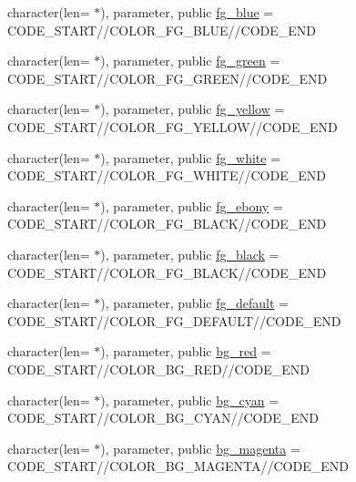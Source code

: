 \begin{DoxyCompactItemize}
\item 
character(len= $\ast$), parameter, public \mbox{\hyperlink{namespacem__escape_a94792b1429eb9880530d93643e9ce22c}{fg\+\_\+blue}} = C\+O\+D\+E\+\_\+\+S\+T\+A\+RT//C\+O\+L\+O\+R\+\_\+\+F\+G\+\_\+\+B\+L\+UE//C\+O\+D\+E\+\_\+\+E\+ND
\item 
character(len= $\ast$), parameter, public \mbox{\hyperlink{namespacem__escape_a1ada5ca3807f86e47be0b48c41e410c7}{fg\+\_\+green}} = C\+O\+D\+E\+\_\+\+S\+T\+A\+RT//C\+O\+L\+O\+R\+\_\+\+F\+G\+\_\+\+G\+R\+E\+EN//C\+O\+D\+E\+\_\+\+E\+ND
\item 
character(len= $\ast$), parameter, public \mbox{\hyperlink{namespacem__escape_a9902f29abc8261843e6b317cd07368ec}{fg\+\_\+yellow}} = C\+O\+D\+E\+\_\+\+S\+T\+A\+RT//C\+O\+L\+O\+R\+\_\+\+F\+G\+\_\+\+Y\+E\+L\+L\+OW//C\+O\+D\+E\+\_\+\+E\+ND
\item 
character(len= $\ast$), parameter, public \mbox{\hyperlink{namespacem__escape_adde79fd804c7dffee08721f5a360345c}{fg\+\_\+white}} = C\+O\+D\+E\+\_\+\+S\+T\+A\+RT//C\+O\+L\+O\+R\+\_\+\+F\+G\+\_\+\+W\+H\+I\+TE//C\+O\+D\+E\+\_\+\+E\+ND
\item 
character(len= $\ast$), parameter, public \mbox{\hyperlink{namespacem__escape_a7b93e25003e389c21833a5ca8605d2de}{fg\+\_\+ebony}} = C\+O\+D\+E\+\_\+\+S\+T\+A\+RT//C\+O\+L\+O\+R\+\_\+\+F\+G\+\_\+\+B\+L\+A\+CK//C\+O\+D\+E\+\_\+\+E\+ND
\item 
character(len= $\ast$), parameter, public \mbox{\hyperlink{namespacem__escape_af2f18b52e294d4b9f312369d9e29421b}{fg\+\_\+black}} = C\+O\+D\+E\+\_\+\+S\+T\+A\+RT//C\+O\+L\+O\+R\+\_\+\+F\+G\+\_\+\+B\+L\+A\+CK//C\+O\+D\+E\+\_\+\+E\+ND
\item 
character(len= $\ast$), parameter, public \mbox{\hyperlink{namespacem__escape_a518f003512a7505cb8bf9585c103900e}{fg\+\_\+default}} = C\+O\+D\+E\+\_\+\+S\+T\+A\+RT//C\+O\+L\+O\+R\+\_\+\+F\+G\+\_\+\+D\+E\+F\+A\+U\+LT//C\+O\+D\+E\+\_\+\+E\+ND
\item 
character(len= $\ast$), parameter, public \mbox{\hyperlink{namespacem__escape_a3cd9ef6cdd5ab3dda36cc9402dff0806}{bg\+\_\+red}} = C\+O\+D\+E\+\_\+\+S\+T\+A\+RT//C\+O\+L\+O\+R\+\_\+\+B\+G\+\_\+\+R\+ED//C\+O\+D\+E\+\_\+\+E\+ND
\item 
character(len= $\ast$), parameter, public \mbox{\hyperlink{namespacem__escape_a7b7a979cd6dc44533f962d323c65a7b6}{bg\+\_\+cyan}} = C\+O\+D\+E\+\_\+\+S\+T\+A\+RT//C\+O\+L\+O\+R\+\_\+\+B\+G\+\_\+\+C\+Y\+AN//C\+O\+D\+E\+\_\+\+E\+ND
\item 
character(len= $\ast$), parameter, public \mbox{\hyperlink{namespacem__escape_aaf244507d267d0ae99ea933a8744c7e4}{bg\+\_\+magenta}} = C\+O\+D\+E\+\_\+\+S\+T\+A\+RT//C\+O\+L\+O\+R\+\_\+\+B\+G\+\_\+\+M\+A\+G\+E\+N\+TA//C\+O\+D\+E\+\_\+\+E\+ND

\end{DoxyCompactItemize}

